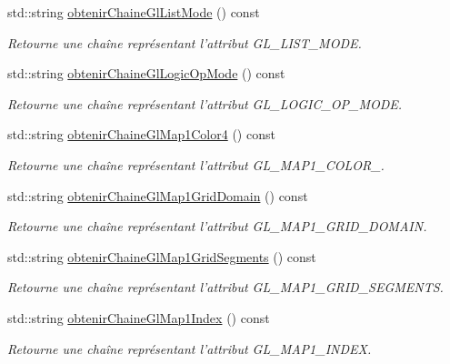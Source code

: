 \begin{DoxyCompactItemize}
std\-::string \hyperlink{group__utilitaire_ga75eb73d049c2865922e414f5a06b749a}{obtenir\-Chaine\-Gl\-List\-Mode} () const 
\begin{DoxyCompactList}\small\item\em Retourne une chaîne représentant l'attribut G\-L\-\_\-\-L\-I\-S\-T\-\_\-\-M\-O\-D\-E. \end{DoxyCompactList}\item 
std\-::string \hyperlink{group__utilitaire_gaf88292802715427e1a4e58f591b8e67e}{obtenir\-Chaine\-Gl\-Logic\-Op\-Mode} () const 
\begin{DoxyCompactList}\small\item\em Retourne une chaîne représentant l'attribut G\-L\-\_\-\-L\-O\-G\-I\-C\-\_\-\-O\-P\-\_\-\-M\-O\-D\-E. \end{DoxyCompactList}\item 
std\-::string \hyperlink{group__utilitaire_gaa3e13a4accbc22c40a52ee9cee9fc3e0}{obtenir\-Chaine\-Gl\-Map1\-Color4} () const 
\begin{DoxyCompactList}\small\item\em Retourne une chaîne représentant l'attribut G\-L\-\_\-\-M\-A\-P1\-\_\-\-C\-O\-L\-O\-R\-\_. \end{DoxyCompactList}\item 
std\-::string \hyperlink{group__utilitaire_gad05cd2af4f512deb88aca0b00b0815c4}{obtenir\-Chaine\-Gl\-Map1\-Grid\-Domain} () const 
\begin{DoxyCompactList}\small\item\em Retourne une chaîne représentant l'attribut G\-L\-\_\-\-M\-A\-P1\-\_\-\-G\-R\-I\-D\-\_\-\-D\-O\-M\-A\-I\-N. \end{DoxyCompactList}\item 
std\-::string \hyperlink{group__utilitaire_gaef4171a2ed92756d394ed8bae1fc57cd}{obtenir\-Chaine\-Gl\-Map1\-Grid\-Segments} () const 
\begin{DoxyCompactList}\small\item\em Retourne une chaîne représentant l'attribut G\-L\-\_\-\-M\-A\-P1\-\_\-\-G\-R\-I\-D\-\_\-\-S\-E\-G\-M\-E\-N\-T\-S. \end{DoxyCompactList}\item 
std\-::string \hyperlink{group__utilitaire_ga52ba9a6fe299e4342d28baac6a83c769}{obtenir\-Chaine\-Gl\-Map1\-Index} () const 
\begin{DoxyCompactList}\small\item\em Retourne une chaîne représentant l'attribut G\-L\-\_\-\-M\-A\-P1\-\_\-\-I\-N\-D\-E\-X. \end{DoxyCompactList}\item 

\end{DoxyCompactItemize}
